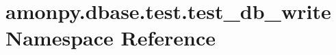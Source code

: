 \hypertarget{namespaceamonpy_1_1dbase_1_1test_1_1test__db__write}{\section{amonpy.\-dbase.\-test.\-test\-\_\-db\-\_\-write Namespace Reference}
\label{namespaceamonpy_1_1dbase_1_1test_1_1test__db__write}
}
